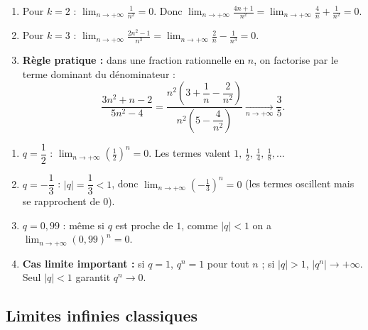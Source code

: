 \documentclass[11pt,a4paper,openany]{book}
\theoremstyle{definition}
\begin{document}
    \begin{Exemple}
    \begin{enumerate}
        \item Pour $k=2$ : $\displaystyle\lim_{n\to+\infty}\frac{1}{n^2}=0$.
              Donc $\displaystyle\lim_{n\to+\infty}\frac{4n+1}{n^2}
              =\lim_{n\to+\infty}\frac{4}{n}+\frac{1}{n^2}=0$.
        \item Pour $k=3$ : $\displaystyle\lim_{n\to+\infty}\frac{2n^2-1}{n^3}
              =\lim_{n\to+\infty}\frac{2}{n}-\frac{1}{n^3}=0$.
        \item \textbf{Règle pratique :} dans une fraction rationnelle en $n$,
              on factorise par le terme dominant du dénominateur :
              \[
                  \frac{3n^2+n-2}{5n^2-4}
                  = \frac{n^2\!\left(3+\dfrac{1}{n}-\dfrac{2}{n^2}\right)}
                         {n^2\!\left(5-\dfrac{4}{n^2}\right)}
                  \xrightarrow[n\to+\infty]{}\frac{3}{5}.
              \]
    \end{enumerate}
    \end{Exemple}

    \begin{Exemple}
    \begin{enumerate}
        \item $q=\dfrac{1}{2}$ : $\displaystyle\lim_{n\to+\infty}\left(\frac{1}{2}\right)^n=0$.
              Les termes valent $1,\,\frac{1}{2},\,\frac{1}{4},\,\frac{1}{8},\ldots$
        \item $q=-\dfrac{1}{3}$ : $|q|=\dfrac{1}{3}<1$, donc
              $\displaystyle\lim_{n\to+\infty}\left(-\frac{1}{3}\right)^n=0$
              (les termes oscillent mais se rapprochent de $0$).
        \item $q=0{,}99$ : même si $q$ est proche de $1$, comme $|q|<1$ on a
              $\displaystyle\lim_{n\to+\infty}(0{,}99)^n=0$.
        \item \textbf{Cas limite important :} si $q=1$, $q^n=1$ pour tout $n$ ;
              si $|q|>1$, $|q^n|\to+\infty$.
              Seul $|q|<1$ garantit $q^n\to 0$.
    \end{enumerate}
    \end{Exemple}

    \subsection{Limites infinies classiques}
\end{document}
